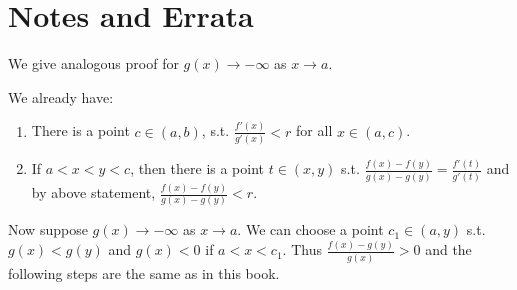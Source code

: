 \section{Notes and Errata}
\begin{note}
    We give analogous proof for $g(x)\to -\infty$ as $x\to a$.\par
    We already have:
    \begin{enumerate}
        \item There is a point $c\in(a,b)$, s.t. $\frac{f'(x)}{g'(x)}<r$ for all $x\in (a,c)$.
        \item If $a<x<y<c$, then there is a point $t\in(x,y)$ s.t. $\frac{f(x)-f(y)}{g(x)-g(y)}=\frac{f'(t)}{g'(t)}$ and by above statement, $\frac{f(x)-f(y)}{g(x)-g(y)}<r$.
    \end{enumerate}
    Now suppose $g(x)\to -\infty$ as $x\to a$. We can choose a point $c_1\in(a,y)$ s.t. $g(x)<g(y)$ and $g(x)<0$ if $a<x<c_1$. Thus $\frac{f(x)-g(y)}{g(x)}>0$ and the following steps are the same as in this book.    
\end{note}
